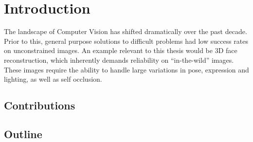 \chapter{Introduction}

The landscape of Computer Vision has shifted dramatically over the
past decade. Prior to this, general purpose solutions to difficult
problems had low success rates on unconstrained images. An example
relevant to this thesis would be 3D face reconstruction, which
inherently demands reliability on ``in-the-wild'' images. These images
require the ability to handle large variations in pose, expression and
lighting, as well as self occlusion.

\section{Contributions}



\section{Outline}







